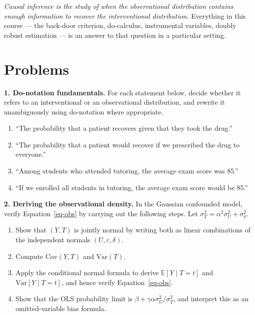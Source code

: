 \documentclass[
  a4paper,
]{book}
\providecommand{\tightlist}{%
  \setlength{\itemsep}{0pt}\setlength{\parskip}{0pt}}
\newcommand{\E}{\mathbb{E}}
\begin{document}
\emph{Causal inference is the study of when the observational
distribution contains enough information to recover the interventional
distribution.} Everything in this course --- the back-door criterion,
do-calculus, instrumental variables, doubly robust estimation --- is an
answer to that question in a particular setting.

\section{Problems}\label{problems}

\textbf{1. Do-notation fundamentals.} For each statement below, decide
whether it refers to an interventional or an observational distribution,
and rewrite it unambiguously using do-notation where appropriate.

\begin{enumerate}
\def\labelenumi{(\alph{enumi})}
\tightlist
\item
  ``The probability that a patient recovers given that they took the
  drug.''
\item
  ``The probability that a patient would recover if we prescribed the
  drug to everyone.''
\item
  ``Among students who attended tutoring, the average exam score was
  85.''
\item
  ``If we enrolled all students in tutoring, the average exam score
  would be 85.''
\end{enumerate}

\textbf{2. Deriving the observational density.} In the Gaussian
confounded model, verify Equation~\ref{eq-obs} by carrying out the
following steps. Let
\(\sigma_T^2 = \alpha^2\sigma_U^2 + \sigma_\delta^2\).

\begin{enumerate}
\def\labelenumi{(\alph{enumi})}
\tightlist
\item
  Show that \((Y, T)\) is jointly normal by writing both as linear
  combinations of the independent normals \((U, \varepsilon, \delta)\).
\item
  Compute \(\mathrm{Cov}(Y, T)\) and \(\mathrm{Var}(T)\).
\item
  Apply the conditional normal formula to derive \(\E[Y \mid T{=}t]\)
  and \(\mathrm{Var}[Y \mid T{=}t]\), and hence verify
  Equation~\ref{eq-obs}.
\item
  Show that the OLS probability limit is
  \(\beta + \gamma\alpha\sigma_U^2/\sigma_T^2\), and interpret this as
  an omitted-variable bias formula.
\end{enumerate}
\end{document}

